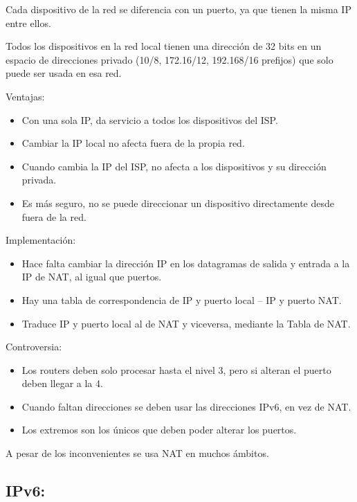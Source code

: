 \documentclass[12pt, twoside, openright]{report} %
\begin{document}
Cada dispositivo de la red se diferencia con un puerto, ya que tienen
la misma IP entre ellos.

Todos los dispositivos en la red local tienen una dirección de 32 bits
en un espacio de direcciones privado (10/8, 172.16/12, 192.168/16
prefijos) que solo puede ser usada en esa red.

Ventajas:

\begin{itemize}
	\item Con una sola IP, da servicio a todos los dispositivos del ISP.
	\item Cambiar la IP local no afecta fuera de la propia red.
	\item Cuando cambia la IP del ISP, no afecta a los dispositivos y su
	      dirección privada.
	\item Es más seguro, no se puede direccionar un dispositivo directamente
	      desde fuera de la red.
\end{itemize}

Implementación:

\begin{itemize}
	\item Hace falta cambiar la dirección IP en los datagramas de salida y
	      entrada a la IP de NAT, al igual que puertos.
	\item Hay una tabla de correspondencia de IP y puerto local -- IP y puerto
	      NAT.
	\item Traduce IP y puerto local al de NAT y viceversa, mediante la Tabla
	      de NAT.
\end{itemize}
\pagebreak
Controversia:

\begin{itemize}
	\item Los routers deben solo procesar hasta el nivel 3, pero si alteran el
	      puerto deben llegar a la 4.
	\item Cuando faltan direcciones se deben usar las direcciones IPv6, en vez
	      de NAT.
	\item Los extremos son los únicos que deben poder alterar los puertos.
\end{itemize}

A pesar de los inconvenientes se usa NAT en muchos ámbitos.


\subsection{IPv6:}
\end{document}
